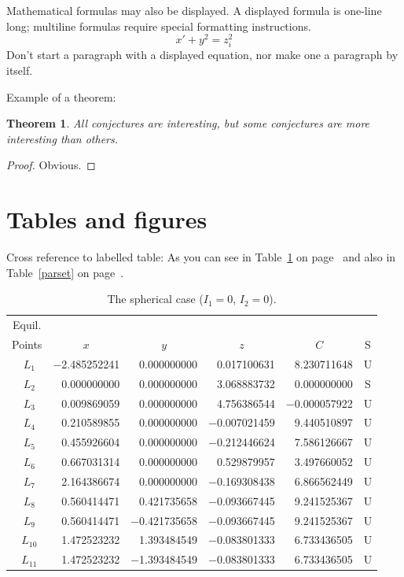 \documentclass[ejs]{imsart}
\numberwithin{equation}{section}
\theoremstyle{plain}
\newtheorem{theorem}{Theorem}[section]
\theoremstyle{definition}
\theoremstyle{remark}
\begin{document}
Mathematical formulas may also be displayed.  A displayed formula is
one-line long; multiline formulas require special formatting
instructions.
   \[  x' + y^{2} = z_{i}^{2}\]
Don't start a paragraph with a displayed equation, nor make
one a paragraph by itself.

Example of a theorem:

\begin{theorem}
All conjectures are interesting, but some conjectures are more
interesting than others.
\end{theorem}

\begin{proof}
Obvious.
\end{proof}

\section{Tables and figures}
Cross reference to labelled table: As you can see in Table~\ref{sphericcase} on
page~\pageref{sphericcase} and also in Table~\ref{parset} on page~\pageref{parset}.

\begin{table}
\caption{The spherical case ($I_1=0$, $I_2=0$).}
\label{sphericcase}
\begin{tabular}{crrrrc}
\hline
Equil. \\
Points & \multicolumn{1}{c}{$x$} & \multicolumn{1}{c}{$y$} & \multicolumn{1}{c}{$z$} & \multicolumn{1}{c}{$C$} &
S \\
\hline
$~~L_1$ & $-$2.485252241 & 0.000000000 & 0.017100631 & 8.230711648 & U \\
$~~L_2$ &    0.000000000 & 0.000000000 & 3.068883732 & 0.000000000 & S \\
$~~L_3$ &    0.009869059 & 0.000000000 & 4.756386544 & $-$0.000057922 & U \\
$~~L_4$ &    0.210589855 & 0.000000000 & $-$0.007021459 & 9.440510897 & U \\
$~~L_5$ &    0.455926604 & 0.000000000 & $-$0.212446624 & 7.586126667 & U \\
$~~L_6$ &    0.667031314 & 0.000000000 & 0.529879957 & 3.497660052 & U \\
$~~L_7$ &    2.164386674 & 0.000000000 & $-$0.169308438 & 6.866562449 & U \\
$~~L_8$ &    0.560414471 & 0.421735658 & $-$0.093667445 & 9.241525367 & U \\
$~~L_9$ &    0.560414471 & $-$0.421735658 & $-$0.093667445 & 9.241525367 & U
\\
$~~L_{10}$ & 1.472523232 & 1.393484549 & $-$0.083801333 & 6.733436505 & U \\
$~~L_{11}$ & 1.472523232 & $-$1.393484549 & $-$0.083801333 & 6.733436505 & U
\\ \hline
\end{tabular}
\end{table}
\end{document}
